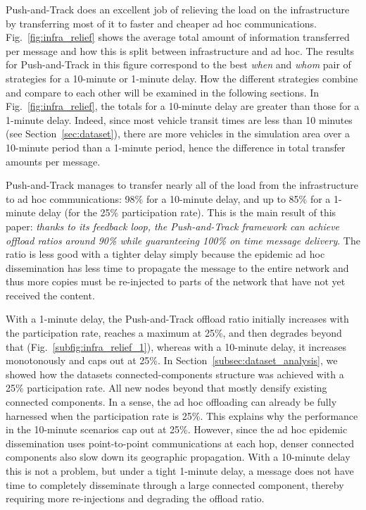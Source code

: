 \documentclass[preprint]{elsarticle}
\begin{document}
Push-and-Track does an excellent job of relieving the load on the infrastructure by transferring most of it to faster and cheaper ad hoc communications. Fig.~\ref{fig:infra_relief} shows the average total amount of information transferred per message and how this is split between infrastructure and ad hoc. The results for Push-and-Track in this figure correspond to the best \textit{when} and \textit{whom} pair of strategies for a 10-minute or 1-minute delay. How the different strategies combine and compare to each other will be examined in the following sections. In Fig.~\ref{fig:infra_relief}, the totals for a 10-minute delay are greater than those for a 1-minute delay. Indeed, since most vehicle transit times are less than 10 minutes (see Section~\ref{sec:dataset}), there are more vehicles in the simulation area over a 10-minute period than a 1-minute period, hence the difference in total transfer amounts per message.

Push-and-Track manages to transfer nearly all of the load from the infrastructure to ad hoc communications: 98\% for a 10-minute delay, and up to 85\% for a 1-minute delay (for the 25\% participation rate). This is the main result of this paper: \emph{thanks to its feedback loop, the Push-and-Track framework can achieve offload ratios around 90\% while guaranteeing 100\% on time message delivery}. The ratio is less good with a tighter delay simply because the epidemic ad hoc dissemination has less time to propagate the message to the entire network and thus more copies must be re-injected to parts of the network that have not yet received the content. 

With a 1-minute delay, the Push-and-Track offload ratio initially increases with the participation rate, reaches a maximum at 25\%, and then degrades beyond that (Fig.~\ref{subfig:infra_relief_1}), whereas with a 10-minute delay, it increases monotonously and caps out at 25\%. In Section~\ref{subsec:dataset_analysis}, we showed how the datasets connected-components structure was achieved with a 25\% participation rate. All new nodes beyond that mostly densify existing connected components. In a sense, the ad hoc offloading can already be fully harnessed when the participation rate is 25\%. This explains why the performance in the 10-minute scenarios cap out at 25\%. However, since the ad hoc epidemic dissemination uses point-to-point communications at each hop, denser connected components also slow down its geographic propagation.  With a 10-minute delay this is not a problem, but under a tight 1-minute delay, a message does not have time to completely disseminate through a large connected component, thereby requiring more re-injections and degrading the offload ratio.
\end{document}
